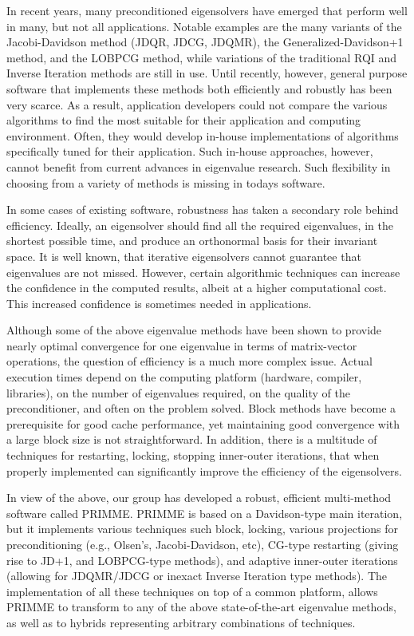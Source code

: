 \documentclass[twosided]{report}
\begin{document}
In recent years, many preconditioned eigensolvers have
emerged that perform well in many, but not all applications.
Notable examples are the many variants of the
Jacobi-Davidson method (JDQR, JDCG, JDQMR), the
Generalized-Davidson+1 method, and the LOBPCG method, while
variations of the traditional RQI and Inverse Iteration
methods are still in use. Until recently, however, general
purpose software that implements these methods both
efficiently and robustly has been very scarce. As a result,
application developers could not compare the various
algorithms to find the most suitable for their application
and computing environment. Often, they would develop
in-house implementations of algorithms specifically tuned
for their application. Such in-house approaches, however,
cannot benefit from current advances in eigenvalue research.
Such flexibility in choosing from a variety of methods is
missing in todays software.

In some cases of existing
software, robustness has taken a secondary role behind
efficiency. Ideally, an eigensolver should find all the
required eigenvalues, in the shortest possible time, and
produce an orthonormal basis for their invariant space. It
is well known, that iterative eigensolvers cannot guarantee
that eigenvalues are not missed. However, certain
algorithmic techniques can increase the confidence in the
computed results, albeit at a higher computational cost.
This increased confidence is sometimes needed in
applications.

Although some of the above eigenvalue
methods have been shown to provide nearly optimal
convergence for one eigenvalue in terms of matrix-vector
operations, the question of efficiency is a much more
complex issue. Actual execution times depend on the
computing platform (hardware, compiler, libraries), on the
number of eigenvalues required, on the quality of the
preconditioner, and often on the problem solved. Block
methods have become a prerequisite for good cache
performance, yet maintaining good convergence with a large
block size is not straightforward. In addition, there is a
multitude of techniques for restarting, locking, stopping
inner-outer iterations, that when properly implemented can
significantly improve the efficiency of the eigensolvers.


In view of the above, our group has developed a robust,
efficient multi-method software called PRIMME. PRIMME is
based on a Davidson-type main iteration, but it implements
various techniques such block, locking, various projections
for preconditioning (e.g., Olsen's, Jacobi-Davidson, etc),
CG-type restarting (giving rise to JD+1, and LOBPCG-type
methods), and adaptive inner-outer iterations (allowing for
JDQMR/JDCG or inexact Inverse Iteration type methods). The
implementation of all these techniques on top of a common
platform, allows PRIMME to transform to any of the above
state-of-the-art eigenvalue methods, as well as to hybrids
representing arbitrary combinations of techniques.
\end{document}
